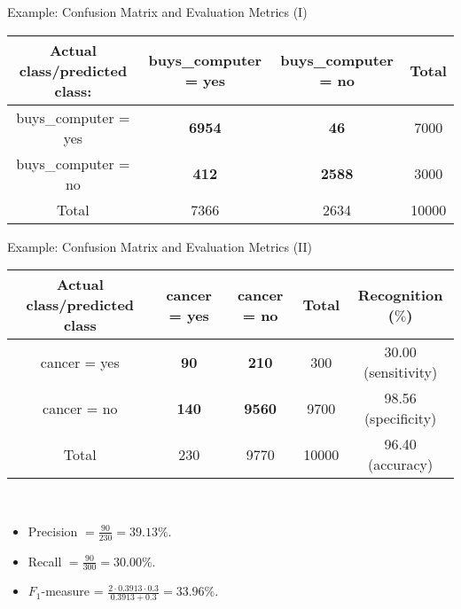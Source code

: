 \begin{frame}{Example: Confusion Matrix and Evaluation Metrics (I)}
	\centering
	\begin{tabular}{|c|c|c|c|}
		\hline
		Actual class/predicted class: & buys\_computer = yes & buys\_computer = no & Total \\\hline
		buys\_computer = yes          & \textbf{6954}        & \textbf{46}         & 7000  \\\hline
		buys\_computer = no           & \textbf{412}         & \textbf{2588}       & 3000  \\\hline
		Total                         & 7366                 & 2634                & 10000 \\\hline
	\end{tabular}
\end{frame}

\begin{frame}{Example: Confusion Matrix and Evaluation Metrics (II)}
	\centering
	\begin{tabular}{|c|c|c|c|c|}
		\hline
		Actual class/predicted class & cancer = yes & cancer = no   & Total & Recognition ($\%$)  \\\hline
		cancer = yes                 & \textbf{90}  & \textbf{210}  & 300   & 30.00 (sensitivity) \\\hline
		cancer = no                  & \textbf{140} & \textbf{9560} & 9700  & 98.56 (specificity) \\\hline
		Total                        & 230          & 9770          & 10000 & 96.40 (accuracy)    \\\hline
	\end{tabular}\\[0.2cm]
	\begin{itemize}
		\item Precision $= \frac{90}{230} = 39.13 \%$.
		\item Recall $=\frac{90}{300} = 30.00 \%$.
		\item $F_1$-measure = $\frac{2 \cdot 0.3913 \cdot 0.3}{0.3913 + 0.3} = 33.96 \%$.
	\end{itemize}
\end{frame}


